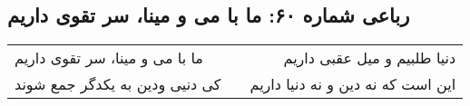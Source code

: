 \begin{center}
\section*{رباعی شماره ۶۰: ما با می و مینا، سر تقوی داریم}
\label{sec:060}
\begin{longtable}{l p{0.5cm} r}
ما با می و مینا، سر تقوی داریم
&&
دنیا طلبیم و میل عقبی داریم
\\
کی دنیی ودین به یکدگر جمع شوند
&&
این است که نه دین و نه دنیا داریم
\\
\end{longtable}
\end{center}
